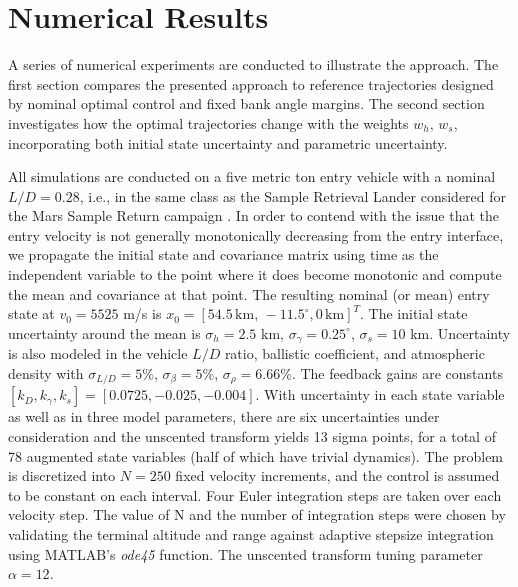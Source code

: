 \documentclass[journal ]{new-aiaa}
\begin{document}
\section*{Numerical Results}
A series of numerical experiments are conducted to illustrate the approach. The first section compares the presented approach to reference trajectories designed by nominal optimal control and fixed bank angle margins. The second section investigates how the optimal trajectories change with the weights $w_h,\,w_s$, incorporating both initial state uncertainty and parametric uncertainty.

All simulations are conducted on a five metric ton entry vehicle with a nominal $L/D=0.28$, i.e., in the same class as the Sample Retrieval Lander considered for the Mars Sample Return campaign \cite{MSR}. In order to contend with the issue that the entry velocity is not generally monotonically decreasing from the entry interface, we propagate the initial state and covariance matrix using time as the independent variable to the point where it does become monotonic and compute the mean and covariance at that point. The resulting nominal (or mean) entry state at $v_0 = 5525$ m/s is $x_0 = [54.5\,\mathrm{km},\,-11.5^{\circ}, 0\,\mathrm{km}]^T$. The initial state uncertainty around the mean is $\sigma_h = 2.5$ km, $\sigma_{\gamma} = 0.25^{\circ}$, $\sigma_s = 10$ km. Uncertainty is also modeled in the vehicle $L/D$ ratio, ballistic coefficient, and atmospheric density with $\sigma_{L/D} = 5\%$, $\sigma_{\beta} = 5\%$, $\sigma_{\rho} = 6.66\%$. The feedback gains are constants $[k_D, k_{\gamma}, k_s] = [0.0725, -0.025, -0.004]$. With uncertainty in each state variable as well as in three model parameters, there are six uncertainties under consideration and the unscented transform yields 13 sigma points, for a total of 78 augmented state variables (half of which have trivial dynamics). The problem is discretized into $N=250$ fixed velocity increments, and the control is assumed to be constant on each interval. Four Euler integration steps are taken over each velocity step. The value of N and the number of integration steps were chosen by validating the terminal altitude and range against adaptive stepsize integration using MATLAB's \textit{ode45} function. The unscented transform tuning parameter $\alpha=12$. 
\end{document}
